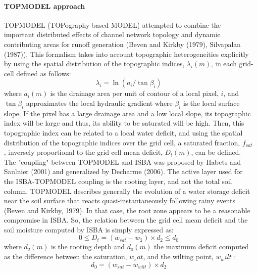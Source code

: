 \paragraph{TOPMODEL approach}    TOPMODEL (TOPography based MODEL) attempted to combine the important 
distributed effects of channel network topology and dynamic contributing areas for runoff 
generation (Beven and Kirkby (1979)\nocite{beven1979}, Silvapalan \etal (1987)\nocite{Silvapalan1987}). This formalism takes into account 
topographic heterogeneities explicitly by using the spatial distribution of the topographic 
indices, $\lambda_i (m)$, in each grid-cell defined as follows:
%
\begin{equation}
  \lambda_i = \ln\left(a_i / \tan\beta_i \right) 
\end{equation}
%
where $a_i (m)$ is the drainage area per unit of contour of a local pixel, $i$, and $\tan\beta_i$ approximates 
the local hydraulic gradient where $\beta_i$ is the local surface slope. If the pixel has a large drainage 
area and a low local slope, its topographic index will be large and thus, its ability to be 
saturated will be high. Then, this topographic index can be related to a local water deficit, and 
using the spatial distribution of the topographic indices over the grid cell, a saturated fraction, 
$f_{sat}$, inversely proportional to the grid cell mean deficit, $D_t (m)$, can be defined. The 
"coupling" between TOPMODEL and ISBA was proposed by Habets and Saulnier (2001)\nocite{Habets2001} and 
generalized by Decharme \etal (2006).
The active layer used for the ISBA-TOPMODEL coupling is the rooting layer, and not 
the total soil column. TOPMODEL describes generally the evolution of a water storage deficit 
near the soil surface that reacts quasi-instantaneously following rainy events 
(Beven and Kirkby, 1979). In that case, the root zone appears to be a reasonable compromise in ISBA. So, 
the relation between the grid cell mean deficit and the soil moisture computed by ISBA is 
simply expressed as:
%
\begin{equation}
  0 \leq D_t = \left(w_{sat} - w_2 \right) \times d_2 \leq d_0 
\end{equation}
%
where $d_2 (m)$ is the rooting depth and $d_0 (m)$ the maximum deficit computed as the difference 
between the saturation, $w_sat$, and the wilting point, $w_wilt$ :
%
\begin{equation}
  d_0= \left(w_{sat} - w_{wilt} \right) \times d_2
\end{equation}

